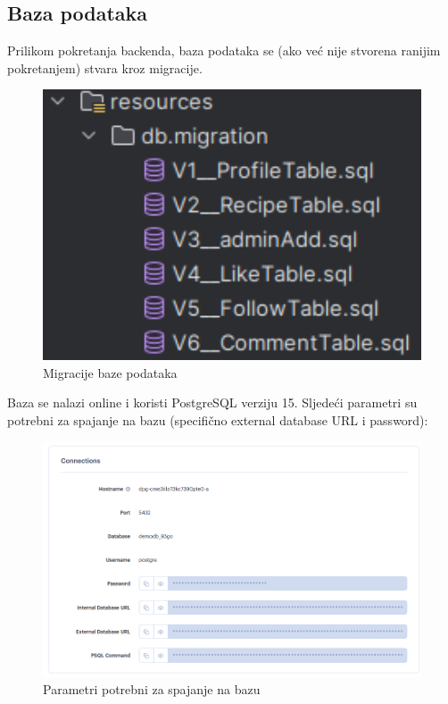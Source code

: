 			\subsection*{Baza podataka}
			Prilikom pokretanja backenda, baza podataka se (ako već nije stvorena ranijim pokretanjem) stvara kroz migracije.
			\begin{figure}[H]
				\centering
				\includegraphics[width=1\textwidth]{slike/databaseImpl.png}
				\caption{Migracije baze podataka}
				\label{fig:database-migrations}
			\end{figure}
			Baza se nalazi online i koristi PostgreSQL verziju 15. Sljedeći parametri su potrebni za spajanje na bazu (specifično external database URL i password):
			\begin{figure}[H]
				\centering
				\includegraphics[width=1\textwidth]{slike/demodb.png}
				\caption{Parametri potrebni za spajanje na bazu}
				\label{fig:database-parameters}
			\end{figure}
			
